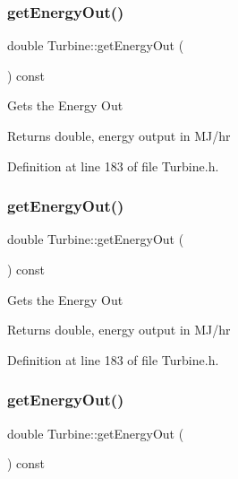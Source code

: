 \subsubsection{\texorpdfstring{get\+Energy\+Out()}{getEnergyOut()}\hspace{0.1cm}{\footnotesize\ttfamily [1/3]}}
{\footnotesize\ttfamily double Turbine\+::get\+Energy\+Out (\begin{DoxyParamCaption}{ }\end{DoxyParamCaption}) const\hspace{0.3cm}{\ttfamily [inline]}}

Gets the Energy Out

\begin{DoxyReturn}{Returns}
double, energy output in M\+J/hr 
\end{DoxyReturn}


Definition at line 183 of file Turbine.\+h.

\mbox{\label{class_turbine_a143fc660274e0d65ccb8fc55cc2caf83}} 
\subsubsection{\texorpdfstring{get\+Energy\+Out()}{getEnergyOut()}\hspace{0.1cm}{\footnotesize\ttfamily [2/3]}}
{\footnotesize\ttfamily double Turbine\+::get\+Energy\+Out (\begin{DoxyParamCaption}{ }\end{DoxyParamCaption}) const\hspace{0.3cm}{\ttfamily [inline]}}

Gets the Energy Out

\begin{DoxyReturn}{Returns}
double, energy output in M\+J/hr 
\end{DoxyReturn}


Definition at line 183 of file Turbine.\+h.

\mbox{\label{class_turbine_a143fc660274e0d65ccb8fc55cc2caf83}} 
\subsubsection{\texorpdfstring{get\+Energy\+Out()}{getEnergyOut()}\hspace{0.1cm}{\footnotesize\ttfamily [3/3]}}
{\footnotesize\ttfamily double Turbine\+::get\+Energy\+Out (\begin{DoxyParamCaption}{ }\end{DoxyParamCaption}) const\hspace{0.3cm}{\ttfamily [inline]}}

